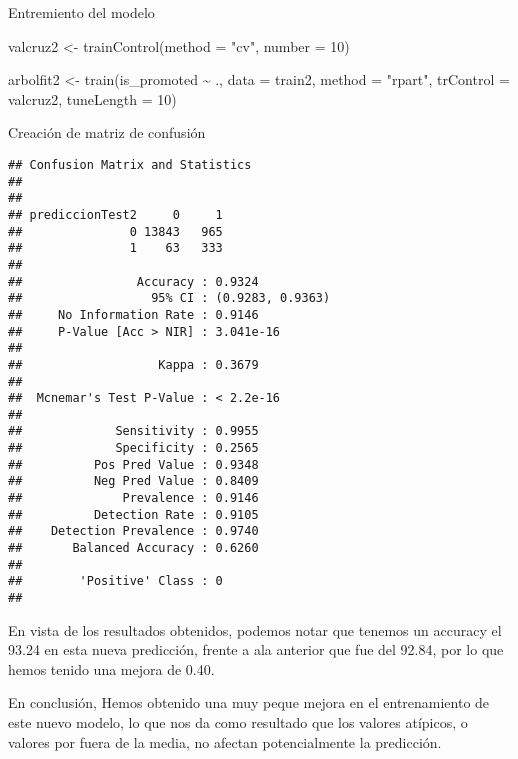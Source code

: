 \documentclass[
]{article}
\newenvironment{Shaded}{\begin{snugshade}}{\end{snugshade}}
\newcommand{\AttributeTok}[1]{\textcolor[rgb]{0.77,0.63,0.00}{#1}}
\newcommand{\DecValTok}[1]{\textcolor[rgb]{0.00,0.00,0.81}{#1}}
\newcommand{\FunctionTok}[1]{\textcolor[rgb]{0.00,0.00,0.00}{#1}}
\newcommand{\NormalTok}[1]{#1}
\newcommand{\OtherTok}[1]{\textcolor[rgb]{0.56,0.35,0.01}{#1}}
\newcommand{\SpecialCharTok}[1]{\textcolor[rgb]{0.00,0.00,0.00}{#1}}
\newcommand{\StringTok}[1]{\textcolor[rgb]{0.31,0.60,0.02}{#1}}
\begin{document}
Entremiento del modelo

\begin{Shaded}
\begin{Highlighting}[]
\NormalTok{valcruz2 }\OtherTok{\textless{}{-}} \FunctionTok{trainControl}\NormalTok{(}\AttributeTok{method =} \StringTok{"cv"}\NormalTok{, }\AttributeTok{number =} \DecValTok{10}\NormalTok{)}

\NormalTok{arbolfit2 }\OtherTok{\textless{}{-}} \FunctionTok{train}\NormalTok{(is\_promoted }\SpecialCharTok{\textasciitilde{}}\NormalTok{ ., }\AttributeTok{data =}\NormalTok{ train2, }\AttributeTok{method =} \StringTok{"rpart"}\NormalTok{,}
                 \AttributeTok{trControl =}\NormalTok{ valcruz2, }\AttributeTok{tuneLength =} \DecValTok{10}\NormalTok{)}
\end{Highlighting}
\end{Shaded}

Creación de matriz de confusión

\begin{Shaded}
\end{Shaded}

\begin{verbatim}
## Confusion Matrix and Statistics
## 
##                
## prediccionTest2     0     1
##               0 13843   965
##               1    63   333
##                                           
##                Accuracy : 0.9324          
##                  95% CI : (0.9283, 0.9363)
##     No Information Rate : 0.9146          
##     P-Value [Acc > NIR] : 3.041e-16       
##                                           
##                   Kappa : 0.3679          
##                                           
##  Mcnemar's Test P-Value : < 2.2e-16       
##                                           
##             Sensitivity : 0.9955          
##             Specificity : 0.2565          
##          Pos Pred Value : 0.9348          
##          Neg Pred Value : 0.8409          
##              Prevalence : 0.9146          
##          Detection Rate : 0.9105          
##    Detection Prevalence : 0.9740          
##       Balanced Accuracy : 0.6260          
##                                           
##        'Positive' Class : 0               
## 
\end{verbatim}

En vista de los resultados obtenidos, podemos notar que tenemos un
accuracy el 93.24 en esta nueva predicción, frente a ala anterior que
fue del 92.84, por lo que hemos tenido una mejora de 0.40.

En conclusión, Hemos obtenido una muy peque mejora en el entrenamiento
de este nuevo modelo, lo que nos da como resultado que los valores
atípicos, o valores por fuera de la media, no afectan potencialmente la
predicción.
\end{document}
